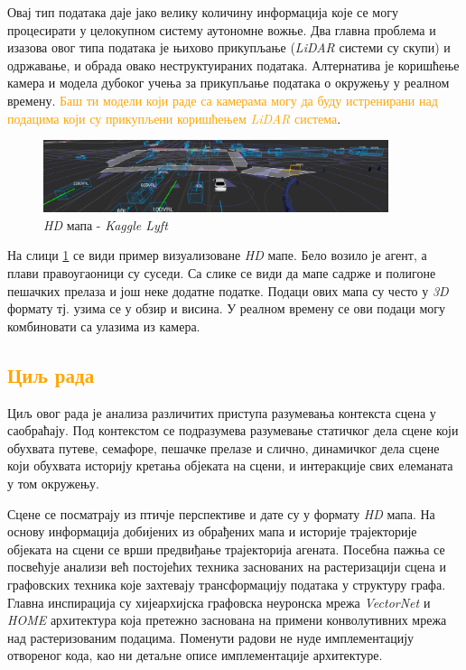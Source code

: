 \documentclass[11pt,oneside]{memoir}
\begin{document}
Овај тип података даје јако велику количину информација које се могу процесирати у целокупном систему аутономне вожње. Два главна проблема
и изазова овог типа података је њихово прикупљање (\textit{LiDAR} системи су скупи) и одржавање, и обрада овако неструктуираних података. Алтернатива
је коришћење камера и модела дубоког учења за прикупљање података о окружењу у реалном времену. \textcolor{orange}{Баш ти модели који раде са
камерама могу да буду истренирани над подацима који су прикупљени коришћењем \textit{LiDAR} система}.

\begin{figure}[H]
  \centering
  \includegraphics[width=0.9\textwidth]{images/lyft-hd-map.png}
  \caption{\textit{HD} мапа - \textit{Kaggle Lyft} \cite{kaggle_lyft} \label{kaggle-lyft-example}}
\end{figure}

На слици \ref{kaggle-lyft-example} се види пример визуализоване \textit{HD} мапе. Бело возило је агент, а плави правоугаоници су суседи. 
Са слике се види да мапе садрже и полигоне пешачких прелаза и још неке додатне податке. Подаци ових мапа су често у \textit{3D} формату
тј. узима се у обзир и висина. У реалном времену се ови подаци могу комбиновати са улазима из камера. 

\textcolor{orange}{\section{Циљ рада}}

Циљ овог рада је анализа различитих приступа разумевања контекста сцена у саобраћају. 
Под контекстом се подразумева разумевање статичког дела сцене који обухвата путеве,
семафоре, пешачке прелазе и слично, динамичког дела сцене који обухвата историју кретања објеката на сцени, и интеракције 
свих елеманата у том окружењу. 

Сцене се посматрају из птичје перспективе
и дате су у формату \textit{HD} мапа. На основу информација добијених из обрађених мапа и историје трајекторије објеката
на сцени се врши предвиђање трајекторија агената. Посебна пажња се посвећује анализи већ постојећих
техника заснованих на растеризацији сцена и графовских техника које захтевају трансформацију података у структуру графа. 
Главна инспирација су хијеархијска графовска неуронска мрежа \textit{VectorNet} \cite{vectornet} и \textit{HOME} \cite{home}
архитектура која претежно заснована на примени конволутивних мрежа над растеризованим подацима. Поменути радови не нуде
имплементацију отвореног кода, као ни детаљне описе имплементације архитектуре.
\end{document}
